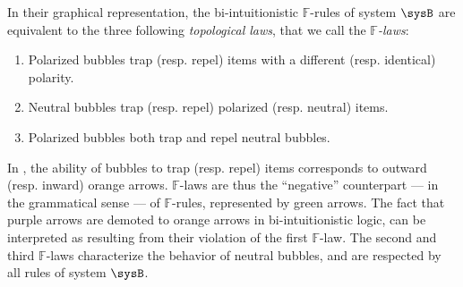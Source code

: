 \begin{description}
  In their graphical representation, the bi-intuitionistic $\mathbb{F}$-rules of
  system $\sysB$ are equivalent to the three following \emph{topological laws},
  that we call the \emph{$\mathbb{F}$-laws}:
  \begin{fact}
    \sbr
    \begin{enumerate}
      \item Polarized bubbles trap (resp. repel) items with a different (resp.
      identical) polarity.
      \item Neutral bubbles trap (resp. repel) polarized (resp. neutral) items.
      \item Polarized bubbles both trap and repel neutral bubbles.
    \end{enumerate}
  \end{fact}
  In , the ability of bubbles to trap (resp. repel)
  items corresponds to outward (resp. inward) orange arrows. $\mathbb{F}$-laws
  are thus the ``negative'' counterpart --- in the grammatical sense --- of
  $\mathbb{F}$-rules, represented by green arrows. The fact that purple arrows
  are demoted to orange arrows in bi-intuitionistic logic, can be interpreted as
  resulting from their violation of the first $\mathbb{F}$-law. The second and
  third $\mathbb{F}$-laws characterize the behavior of neutral bubbles, and are
  respected by all rules of system $\sysB$.
  

\end{description}
